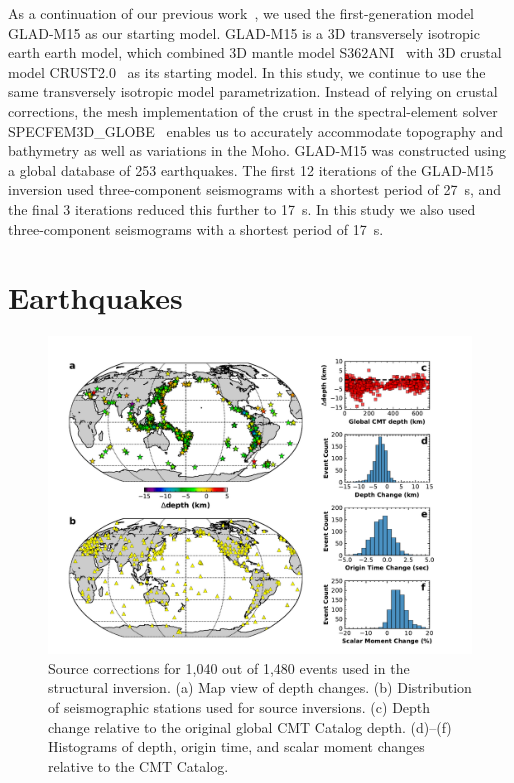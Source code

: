 As a continuation of our previous work~\cite{bozdaug2016global},
we used the first-generation model GLAD-M15 as our
starting model.
GLAD-M15 is a 3D transversely isotropic earth earth model, which combined
3D mantle model S362ANI~\cite{kustowski2008anisotropic}
with 3D crustal model CRUST2.0~\cite{bassin2000current} as its starting model.
In this study,
we continue to use the same transversely isotropic model parametrization.
Instead of relying on crustal corrections,
the mesh implementation of the crust in the spectral-element solver SPECFEM3D\_GLOBE~\cite{KoTr02a,KoTr02b,PeKoLuMaLeCaLeMaLiBlNiBaTr11} enables us to accurately accommodate topography and bathymetry as well as variations in the Moho.
GLAD-M15 was constructed using a global database of 253 earthquakes.
The first 12 iterations of the GLAD-M15 inversion used three-component seismograms with a shortest period of 27~s,
and the final 3 iterations reduced this further to 17~s.
In this study we also used three-component seismograms with a shortest period of 17~s.

\section{Earthquakes}
\label{section:earthquakes}

\begin{figure}
  \centering
  \includegraphics[width=\textwidth]{ch-GLADM25/figures/source_corrections.pdf}
  \caption[Source corrections for 1,040 events]
  {\small{Source corrections for 1,040 out of 1,480 events used in the structural inversion. (a) Map view of depth changes. (b) Distribution of seismographic stations used for source inversions. (c) Depth change relative to the original global CMT Catalog depth. (d)--(f) Histograms of depth, origin time, and scalar moment changes relative to the CMT Catalog.
  }}
  \label{fig:source_correction}
\end{figure}

